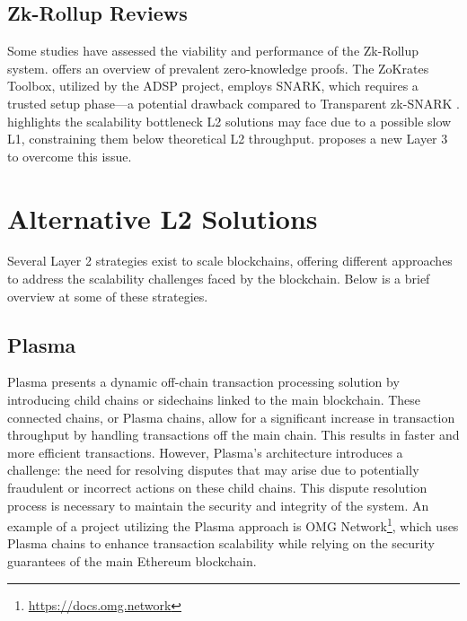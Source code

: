 \subsection{Zk-Rollup Reviews}
Some studies have assessed the viability and performance of the Zk-Rollup system. \cite{capko_state_2022} offers an overview of prevalent zero-knowledge proofs. The ZoKrates Toolbox, utilized by the ADSP project, employs SNARK, which requires a trusted setup phase—a potential drawback compared to Transparent zk-SNARK \cite{zhou_overview_2022}. \cite{neiheiser_practical_2023} highlights the scalability bottleneck L2 solutions may face due to a possible slow L1, constraining them below theoretical L2 throughput. \cite{starkware_fractal_2021} proposes a new Layer 3 to overcome this issue.

\section{Alternative L2 Solutions}
Several Layer 2 strategies exist to scale blockchains, offering different approaches to address the scalability challenges faced by the blockchain. Below is a brief overview at some of these strategies.

\subsection{Plasma}
Plasma presents a dynamic off-chain transaction processing solution by introducing child chains or sidechains linked to the main blockchain. These connected chains, or Plasma chains, allow for a significant increase in transaction throughput by handling transactions off the main chain. This results in faster and more efficient transactions. However, Plasma's architecture introduces a challenge: the need for resolving disputes that may arise due to potentially fraudulent or incorrect actions on these child chains\cite{thibault_blockchain_2022}. This dispute resolution process is necessary to maintain the security and integrity of the system. An example of a project utilizing the Plasma approach is OMG Network\footnote{\url{https://docs.omg.network}}, which uses Plasma chains to enhance transaction scalability while relying on the security guarantees of the main Ethereum blockchain.

